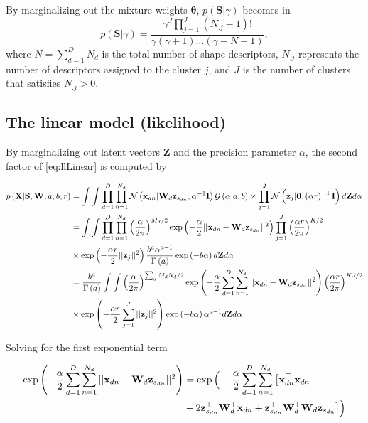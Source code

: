 \documentclass[]{article}
\newcommand{\gD}[2]{\mathcal{N}\left(#1,#2\right)}
\newcommand{\kernel}[2]{k\left(#1,#2\right)}
\newcommand{\catD}[2]{\mathcal{G}\left(#1,#2\right)}
\newcommand{\Z}{\boldsymbol{\mathrm{Z}}}
\newcommand{\gammaA}{\Gamma\left(a\right)}
\newcommand{\eye}{\mathbf{I}}
\newcommand{\Scluster}{\mathbf{S}}
\newcommand{\WIn}{\mathbf{W}}
\newcommand{\indobj}{\mathbf{x}_{dn}}
\newcommand{\projMat}{\boldsymbol{\mathcal{W}}_d}
\newcommand{\projMatI}{\mathbf{W}_d}
\newcommand{\lvecI}{\mathbf{z}_j}
\newcommand{\lvecsI}{\mathbf{z}_{s_{dn}}}
\newcommand{\lvecs}{\boldsymbol{\zeta}_{s_{dn}}}
\newcommand{\phixnd}{\boldsymbol{\phi}\left(\indobj\right)}
\begin{document}
By marginalizing out the mixture weights $\boldsymbol{\theta}$, $p\left(\mathbf{S}|\gamma\right)$ becomes in
\begin{equation}
p\left(\mathbf{S}|\gamma\right) =\frac{\gamma^{J}\prod\limits_{j=1}^{J}{\left(N_{.j}-1\right)!}}{\gamma\left(\gamma+1\right)\dots\left(\gamma+N-1\right)},
\end{equation}
where $N=\sum\limits_{d=1}^{D}N_d$ is the total number of shape
descriptors, $N_{.j}$ represents the number of descriptors assigned to
the cluster $j$, and $J$ is the number of clusters that satisfies
$N_{.j}>0$. 

\subsection{The linear model (likelihood)}
By marginalizing out latent vectors $\mathbf{Z}$ and the
precision parameter $\alpha$, the second factor of \eqref{eq:llLinear} is
computed by

\begin{align}
p\left(\mathbf{X}|\Scluster,\WIn,a,b,r\right) &=  \int \int \prod_{d=1}^{D}\prod_{n=1}^{N_d}{\gD{\indobj|\projMatI \lvecsI}{\alpha^{-1}\eye}\catD{\alpha|a}{b}} \times \prod_{j=1}^{J}\gD{\lvecI|\mathbf{0}}{\left(\alpha r\right)^{-1}\eye}d\Z d\alpha  \notag \\
&=\int \int \prod_{d=1}^{D}\prod_{n=1}^{N_d}\left(\frac{\alpha}{2\pi}\right)^{M_d /2}\exp\left(-\frac{\alpha}{2}||\indobj-\projMatI\lvecsI||^2\right) \prod_{j=1}^{J}\left(\frac{\alpha r}{2\pi}\right)^{K/2} \notag \\
&\times \exp\left(-\frac{\alpha r}{2}||\lvecI||^2\right)\frac{b^a \alpha^{a-1}}{\gammaA}\exp\left(-b\alpha\right)d\Z d\alpha \notag\\
&=\frac{b^a}{\gammaA}\int \int \left(\frac{\alpha}{2\pi}\right)^{\sum_d M_d N_d /2}\exp\left(-\frac{\alpha}{2} \sum_{d=1}^{D}\sum_{n=1}^{N_d}||\indobj-\projMatI\lvecsI||^2\right)\left(\frac{\alpha r}{2\pi}\right)^{KJ/2} \notag \\
&\times \exp\left(-\frac{\alpha r}{2} \sum_{j=1}^{J}||\lvecI||^2\right)\exp\left(-b\alpha\right)\alpha^{a-1}d\Z d\alpha 
\label{eq:llnmlin}
\end{align}


Solving for the first exponential term

\begin{align}
\exp\left(-\frac{\alpha}{2} \sum_{d=1}^{D}\sum_{n=1}^{N_d}||\indobj-\projMatI\lvecsI||^2\right) &= \exp\Big(-\frac{\alpha}{2} \sum_{d=1}^{D}\sum_{n=1}^{N_d}\big[ \indobj^\top \indobj  \notag\\
&  - 2 \lvecsI ^\top \projMatI^\top \indobj + \lvecsI^\top \projMatI^\top \projMatI \lvecsI \big]\Big) \notag\\
\label{eq:exp_XWzlin}
\end{align}
\end{document}
